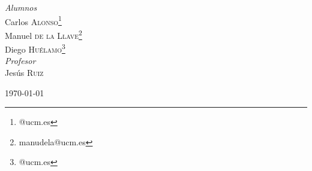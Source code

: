 \documentclass[12pt]{article}
\begin{document}
\begin{titlepage}
	\vfill
	\begin{multicols}{2}
			\large
			\textit{Alumnos}\\
			Carlos \textsc{Alonso}\footnote{@ucm.es}\\
			Manuel \textsc{de la Llave}\footnote{manudela@ucm.es}\\
			Diego \textsc{Huélamo}\footnote{@ucm.es}\\
	\columnbreak
			\large
			\textit{Profesor}\\
			Jesús \textsc{Ruiz} %
	\end{multicols}
	
	
	\vfill\vfill\vfill %
	
	{\large \today} %
	
	
	 
	
	\vfill %
	
\end{titlepage}

\clearpage
\tableofcontents
\clearpage
\end{document}
